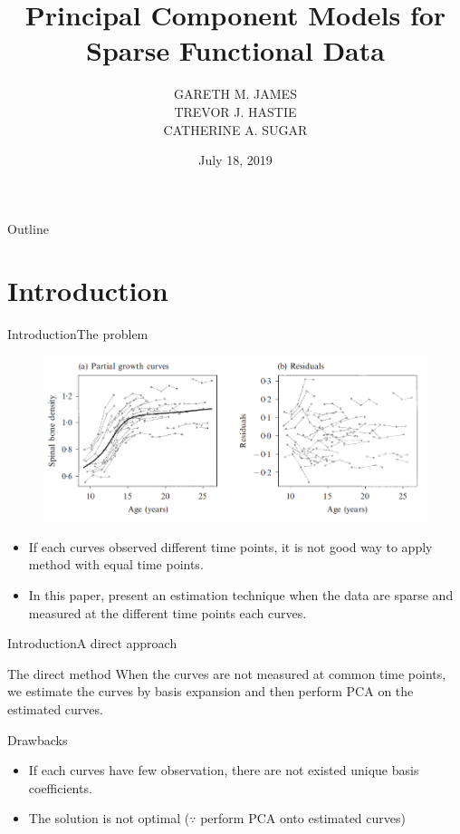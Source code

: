 \documentclass{beamer}
\title{Principal Component Models for Sparse Functional Data}
\date[Short Occasion]{July 18, 2019}
\author{GARETH M. JAMES\\ TREVOR J. HASTIE\\ CATHERINE A. SUGAR}
\subtitle{}
\begin{document}
\begin{frame}
  \titlepage
\end{frame}

\begin{frame}{Outline}
  \tableofcontents
\end{frame}

\section{Introduction}


\begin{frame}{Introduction}{The problem}
	\begin{figure}[h] %
		\begin{center}
			\includegraphics[width=0.7\linewidth]{img/1.png}
		\end{center}
		\label{fig:long}
		\label{fig:onecol}
	\end{figure}	
  \begin{itemize}
  	\item {
	    If each curves observed different time points, it is not good way to apply method with equal time points.
	}
	\item {
		In this paper, present an estimation technique when the data are sparse and measured at the different time points each curves.
	}	
  \end{itemize}
\end{frame}

\begin{frame}{Introduction}{A direct approach}
	\begin{block}{The direct method}
		When the curves are not measured at common time points, we estimate the curves by basis expansion and then perform PCA on the estimated curves.
	\end{block}
	\begin{block}{Drawbacks}
	\begin{itemize}
		\item {
			If each curves have few observation, there are not existed unique basis coefficients.
		}
		\item {
			The solution is not optimal ($\because$ perform PCA onto estimated curves)
		}
	\end{itemize}
	\end{block}
\end{frame}
\end{document}
